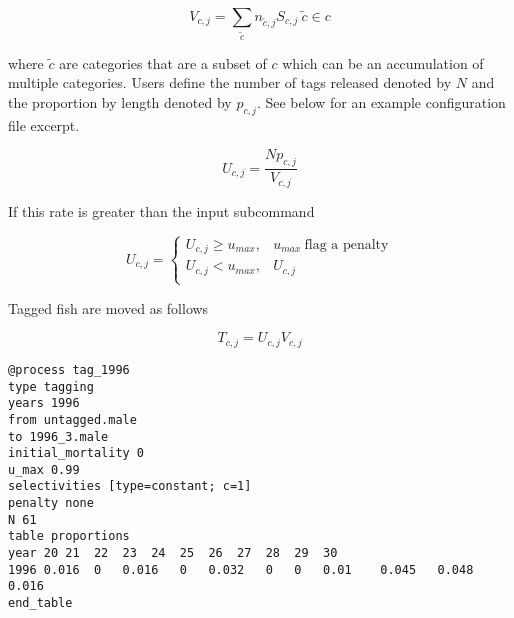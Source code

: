 \begin{equation*}
	V_{c,j} = \sum\limits_{\tilde{c}} n_{\tilde{c}, j} S_{c,j} \ \tilde{c} \in c
\end{equation*}

where \(\tilde{c}\) are categories that are a subset of \(c\) which can be an accumulation of multiple categories. Users define the number of tags released denoted by \(N\) and the proportion by length denoted by \(p_{c,j}\). See below for an example configuration file excerpt.

\begin{equation*}
U_{c,j} = \frac{Np_{c,j}}{V_{c,j}}
\end{equation*}

If this rate is greater than the input subcommand 

\begin{equation*}
U_{c,j} = 
\begin{cases}
	U_{c,j} \geq u_{max}, & u_{max} \ \text{flag a penalty}\\
	U_{c,j} < u_{max}, & U_{c,j} \\
\end{cases}
\end{equation*}

Tagged fish are moved as follows

\begin{equation*}
	T_{c,j} = U_{c,j} V_{c,j}
\end{equation*}

{\small{\begin{verbatim}
@process tag_1996
type tagging
years 1996
from untagged.male
to 1996_3.male
initial_mortality 0
u_max 0.99
selectivities [type=constant; c=1]
penalty none
N 61
table proportions
year 20	21	22	23	24	25	26	27	28	29	30
1996 0.016	0	0.016	0	0.032	0	0	0.01	0.045	0.048	0.016	
end_table
\end{verbatim}}}

